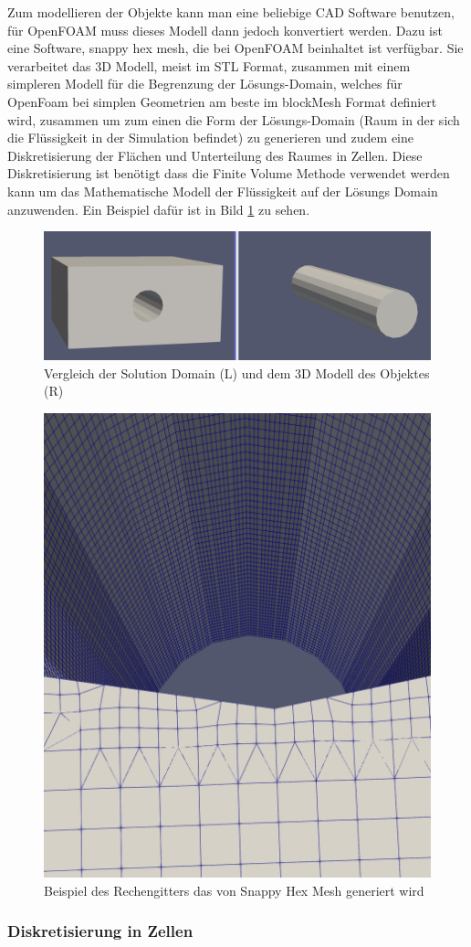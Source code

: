 Zum modellieren der Objekte kann man eine beliebige CAD Software benutzen, für OpenFOAM muss dieses Modell dann jedoch konvertiert werden.
Dazu ist eine Software, snappy hex  mesh, die bei OpenFOAM beinhaltet ist verfügbar.
Sie verarbeitet das 3D Modell, meist im STL Format, zusammen mit einem simpleren Modell für die Begrenzung der Lösungs-Domain, welches für OpenFoam bei simplen Geometrien am beste im blockMesh Format definiert wird, zusammen um zum einen die Form der Lösungs-Domain (Raum in der sich die Flüssigkeit in der Simulation befindet) zu generieren und zudem eine Diskretisierung der Flächen und Unterteilung des Raumes in Zellen.
Diese Diskretisierung ist benötigt dass die Finite Volume Methode verwendet werden kann um das Mathematische Modell der Flüssigkeit auf der Lösungs Domain anzuwenden.
Ein Beispiel dafür ist in Bild \ref{openfoam:fig:SD_Modell_vergleich} zu sehen.
\begin{figure}[h]
	\centering
	\includegraphics[scale=0.1]{papers/openfoam/Bilder/vergleich_solution_domain_object.png}
	\caption{Vergleich der Solution Domain (L) und dem 3D Modell des Objektes (R)}
	\label{openfoam:fig:SD_Modell_vergleich}
\end{figure}


\begin{figure}[h]
	\centering
	\includegraphics[scale=0.1]{papers/openfoam/Bilder/grid.png }
	\caption{Beispiel des Rechengitters das von Snappy Hex Mesh generiert wird}
	\label{openfoam:fig:sim_grid}
\end{figure}
\subsubsection{Diskretisierung in Zellen}